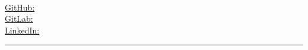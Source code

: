 \begin{center}
	\begin{minipage}[b]{.3\textwidth}
	\raggedright
	{\large \phone} \\ %
	{\city} \\ %
	\href{mailto:\email}{\email} %
	\end{minipage}%
	\begin{minipage}[b]{.4\textwidth}
	\makeatletter
	\centering {\HUGE \@author} \\
	\makeatother
    \vspace{.5em}
    {\color{highlight} \Large{\role}}
	\end{minipage}%
	\begin{minipage}[b]{.3\textwidth}
	\raggedleft 
	\href{https://github.com/\github}{GitHub: \github} \\%
	\href{https://gitlab.com/\gitlab}{GitLab: \gitlab} \\%
	\href{https://www.linkedin.com/in/\LinkedIn}{LinkedIn: \LinkedIn} %
	\end{minipage}

{\color{highlight} \hrule}
\end{center}